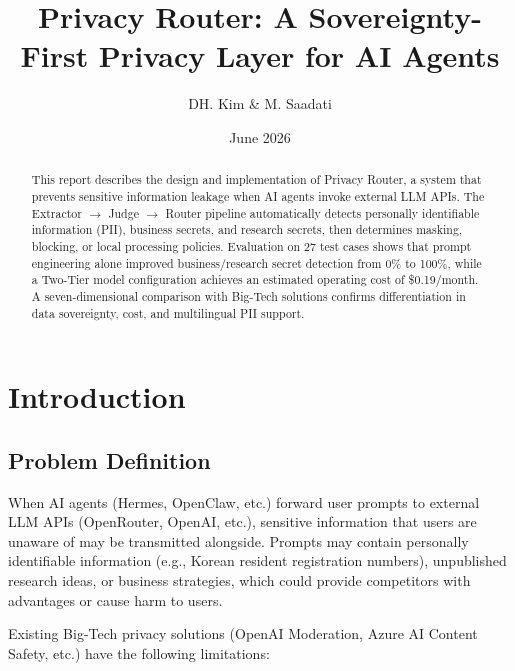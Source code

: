 \documentclass[11pt,a4paper]{article}
\title{Privacy Router: A Sovereignty-First Privacy Layer for AI Agents}
\author{DH. Kim \& M. Saadati}
\date{June 2026}
\begin{document}
\maketitle

\begin{abstract}
This report describes the design and implementation of Privacy Router, a system that prevents sensitive information leakage when AI agents invoke external LLM APIs. The Extractor $\rightarrow$ Judge $\rightarrow$ Router pipeline automatically detects personally identifiable information (PII), business secrets, and research secrets, then determines masking, blocking, or local processing policies. Evaluation on 27 test cases shows that prompt engineering alone improved business/research secret detection from 0\% to 100\%, while a Two-Tier model configuration achieves an estimated operating cost of \$0.19/month. A seven-dimensional comparison with Big-Tech solutions confirms differentiation in data sovereignty, cost, and multilingual PII support.
\end{abstract}

\tableofcontents
\newpage

\section{Introduction}

\subsection{Problem Definition}

When AI agents (Hermes, OpenClaw, etc.) forward user prompts to external LLM APIs (OpenRouter, OpenAI, etc.), sensitive information that users are unaware of may be transmitted alongside. Prompts may contain personally identifiable information (e.g., Korean resident registration numbers), unpublished research ideas, or business strategies, which could provide competitors with advantages or cause harm to users.

Existing Big-Tech privacy solutions (OpenAI Moderation, Azure AI Content Safety, etc.) have the following limitations:
\end{document}
